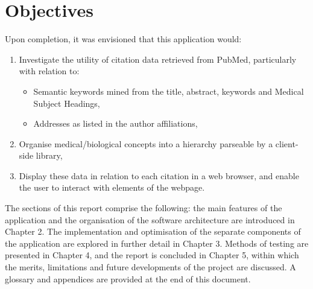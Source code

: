 \documentclass[Report.tex]{subfiles}
\begin{document}
\section{Objectives}
Upon completion, it was envisioned that this application would:

\begin{enumerate}
\item Investigate the utility of citation data retrieved from PubMed, particularly with relation to:
	\begin{itemize}
	\item Semantic keywords mined from the title, abstract, keywords and Medical Subject Headings,
	\item Addresses as listed in the author affiliations,
	\end{itemize}
\item Organise medical/biological concepts into a hierarchy parseable by a client-side library,
\item Display these data in relation to each citation in a web browser, and enable the user to interact with elements of the webpage.
\end{enumerate}

\noindent The sections of this report comprise the following: the main features of the application and the organisation of the software architecture are introduced in Chapter 2. The implementation and optimisation of the separate components of the application are explored in further detail in Chapter 3. Methods of testing are presented in Chapter 4, and the report is concluded in Chapter 5, within which the merits, limitations and future developments of the project are discussed. A glossary and appendices are provided at the end of this document.
\end{document}
